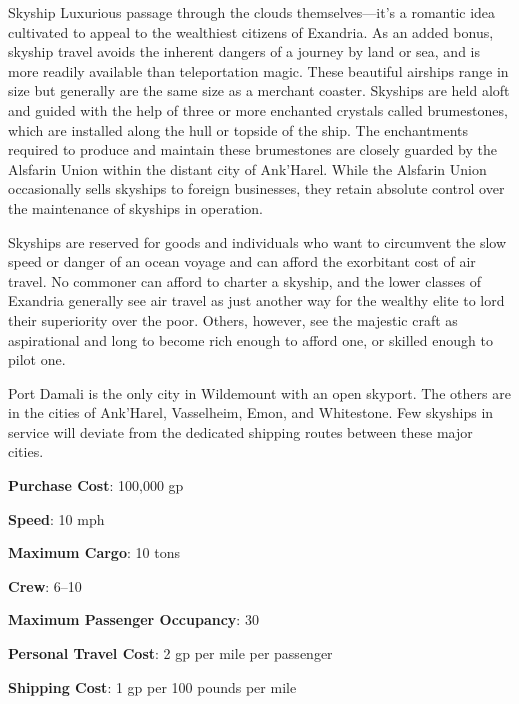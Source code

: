 \documentclass[10pt,a4paper,twoside,bg=print,twocolumn,openany,nodeprecatedcode]{dndbook}
\begin{document}
\begin{DndSidebar}[float=!b]{Skyship}
Luxurious passage through the clouds themselves—it's a romantic idea cultivated to appeal to the wealthiest citizens of Exandria. As an added bonus, skyship travel avoids the inherent dangers of a journey by land or sea, and is more readily available than teleportation magic. These beautiful airships range in size but generally are the same size as a merchant coaster. Skyships are held aloft and guided with the help of three or more enchanted crystals called brumestones, which are installed along the hull or topside of the ship. The enchantments required to produce and maintain these brumestones are closely guarded by the Alsfarin Union within the distant city of Ank'Harel. While the Alsfarin Union occasionally sells skyships to foreign businesses, they retain absolute control over the maintenance of skyships in operation.



Skyships are reserved for goods and individuals who want to circumvent the slow speed or danger of an ocean voyage and can afford the exorbitant cost of air travel. No commoner can afford to charter a skyship, and the lower classes of Exandria generally see air travel as just another way for the wealthy elite to lord their superiority over the poor. Others, however, see the majestic craft as aspirational and long to become rich enough to afford one, or skilled enough to pilot one.



Port Damali is the only city in Wildemount with an open skyport. The others are in the cities of Ank'Harel, Vasselheim, Emon, and Whitestone. Few skyships in service will deviate from the dedicated shipping routes between these major cities.



\textbf{Purchase Cost}: 100,000 gp



\textbf{Speed}: 10 mph



\textbf{Maximum Cargo}: 10 tons



\textbf{Crew}: 6–10



\textbf{Maximum Passenger Occupancy}: 30



\textbf{Personal Travel Cost}: 2 gp per mile per passenger



\textbf{Shipping Cost}: 1 gp per 100 pounds per mile



\end{DndSidebar}
\end{document}
